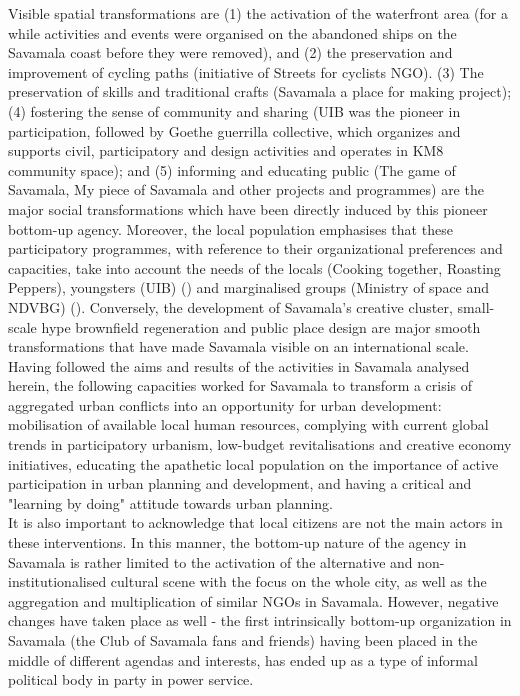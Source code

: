 \documentclass[11pt]{report}
\begin{document}
Visible spatial transformations are
(1) the activation of the waterfront area (for a while activities and events were organised on the abandoned ships on the Savamala coast before they were removed),
and
(2) the preservation and improvement of cycling paths (initiative of Streets for cyclists NGO).
(3) The preservation of skills and traditional crafts (Savamala a place for making project);
(4) fostering the sense of community and sharing (UIB was the pioneer in participation, followed by Goethe guerrilla collective, which organizes and supports civil, participatory and design activities and operates in KM8 community space);
and
(5) informing and educating public (The game of Savamala, My piece of Savamala and other projects and programmes) are the major social transformations which have been directly induced by this pioneer bottom-up agency.
Moreover, the local population emphasises that these participatory programmes, with reference to their organizational preferences and capacities, take into account the needs of the locals (Cooking together, Roasting Peppers), youngsters (UIB) (\href{Muller}{\cite{(Müller-WieferigAndHerzen2013}})
and marginalised groups (Ministry of space and NDVBG)
(\href{Mitic}{\cite{MiticAndMiladinovic2016}}).
Conversely, the development of Savamala’s creative cluster, small-scale hype brownfield regeneration and public place design are major smooth transformations that have made Savamala visible on an international scale.
\\

Having followed the aims and results of the activities in Savamala analysed herein, the following capacities worked for Savamala to transform a crisis of aggregated urban conflicts into an opportunity for urban development:
mobilisation of available local human resources,
complying with current global trends in participatory urbanism, low-budget revitalisations and creative economy initiatives, educating the apathetic local population on the importance of active participation in urban planning and development,
and
having a critical and "learning by doing" attitude  towards urban planning.
\\

It is also important to acknowledge that local citizens are not the main actors in these interventions.
In this manner, the bottom-up nature of the agency in Savamala is rather limited to the activation of the alternative and non-institutionalised cultural scene with the focus on the whole city, as well as the aggregation and multiplication of similar NGOs in Savamala.
However, negative changes have taken place as well - the first intrinsically bottom-up organization in Savamala (the Club of Savamala fans and friends) having been placed in the middle of different agendas and interests, has ended up as a type of informal political body in party in power service.
\\
\end{document}
